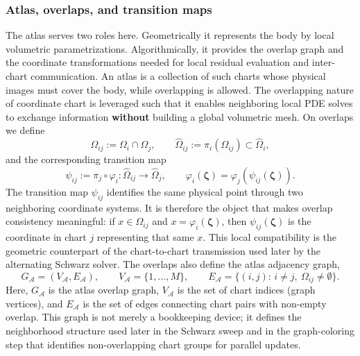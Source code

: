 \documentclass[sort&compress]{svjour3} %
\begin{document}
\subsubsection{Atlas, overlaps, and transition maps}
The atlas serves two roles here. Geometrically it represents the body by local volumetric parametrizations.  Algorithmically, it provides the overlap graph and the coordinate transformations needed for local residual evaluation and inter-chart communication. 
An atlas is a collection of such charts whose physical images must cover the body, while overlapping is allowed. The overlapping nature of coordinate chart is leveraged such that it enables neighboring local PDE solves to exchange information \textbf{without} building a global volumetric mesh. 
On overlaps we define
\begin{equation}
\Omega_{ij}:=\Omega_i\cap \Omega_j,
\qquad
\widehat{\Omega}_{ij}:=\pi_i(\Omega_{ij})\subset \widehat{\Omega}_i,
\label{eq:atlas_overlap}
\end{equation}
and the corresponding transition map
\begin{equation}
\psi_{ij}:=\pi_j\circ \varphi_i:\widehat{\Omega}_{ij}\rightarrow \widehat{\Omega}_j,
\qquad
\varphi_i(\boldsymbol{\zeta})=\varphi_j(\psi_{ij}(\boldsymbol{\zeta})).
\label{eq:atlas_transition}
\end{equation}
The transition map $\psi_{ij}$ identifies the same physical point through two neighboring coordinate systems. It is therefore the object that makes overlap consistency meaningful: if $x\in\Omega_{ij}$ and $x=\varphi_i(\boldsymbol{\zeta})$, then $\psi_{ij}(\boldsymbol{\zeta})$ is the coordinate in chart $j$ representing that same $x$. This local compatibility is the geometric counterpart of the chart-to-chart transmission used later by the alternating Schwarz solver.
The overlaps also define the atlas adjacency graph,
\begin{equation}
G_{\mathcal{A}}=(V_{\mathcal{A}},E_{\mathcal{A}}),
\qquad
V_{\mathcal{A}}=\{1,\dots,M\},
\qquad
E_{\mathcal{A}}=\{(i,j):\, i\neq j,\ \Omega_{ij}\neq \emptyset\}.
\label{eq:atlas_overlap_graph}
\end{equation}
Here, $G_{\mathcal{A}}$ is the atlas overlap graph, $V_{\mathcal{A}}$ is the set of chart indices (graph vertices), and $E_{\mathcal{A}}$ is the set of edges connecting chart pairs with non-empty overlap.
This graph is not merely a bookkeeping device; it defines the neighborhood structure used later in the Schwarz sweep and in the graph-coloring step that identifies non-overlapping chart groups for parallel updates.
\end{document}
